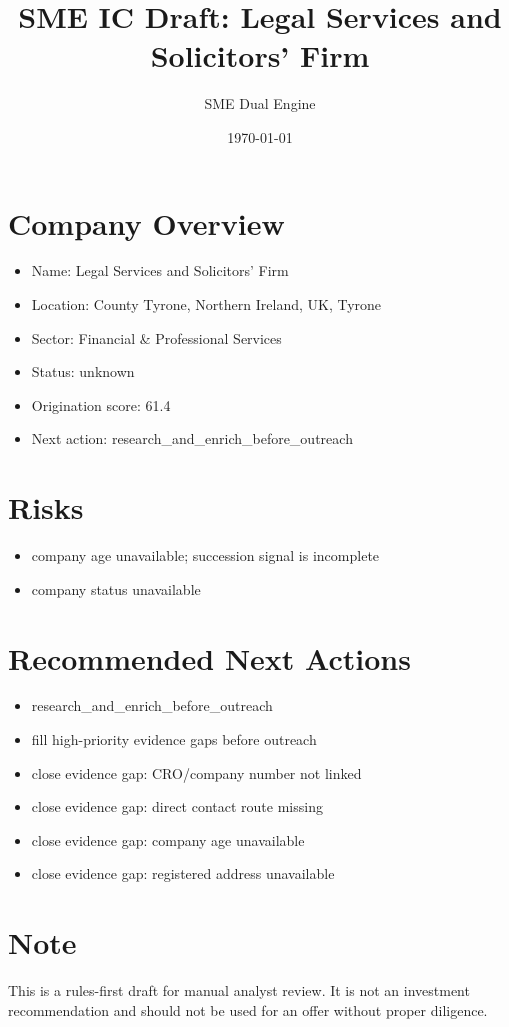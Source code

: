 \documentclass[11pt,a4paper]{article}
\title{SME IC Draft: Legal Services and Solicitors' Firm}
\author{SME Dual Engine}
\date{\today}
\begin{document}
\maketitle
\section*{Company Overview}
\begin{itemize}[leftmargin=1.4em]
\item Name: Legal Services and Solicitors' Firm
\item Location: County Tyrone, Northern Ireland, UK, Tyrone
\item Sector: Financial \& Professional Services
\item Status: unknown
\item Origination score: 61.4
\item Next action: research\_and\_enrich\_before\_outreach
\end{itemize}
\section*{Risks}
\begin{itemize}[leftmargin=1.4em]
\item company age unavailable; succession signal is incomplete
\item company status unavailable
\end{itemize}
\section*{Recommended Next Actions}
\begin{itemize}[leftmargin=1.4em]
\item research\_and\_enrich\_before\_outreach
\item fill high-priority evidence gaps before outreach
\item close evidence gap: CRO/company number not linked
\item close evidence gap: direct contact route missing
\item close evidence gap: company age unavailable
\item close evidence gap: registered address unavailable
\end{itemize}
\section*{Note}
This is a rules-first draft for manual analyst review. It is not an investment
recommendation and should not be used for an offer without proper diligence.
\end{document}
